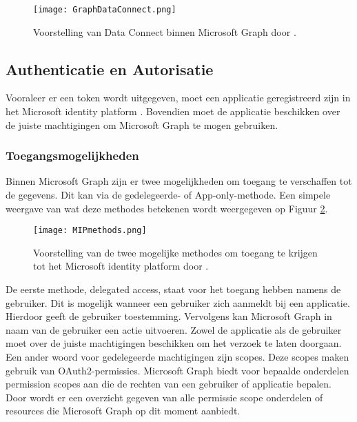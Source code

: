 \begin{figure}[!h]
    \texttt{[image: GraphDataConnect.png]}
    \caption[Voorbeeld Microsoft Graph Data Connect]{Voorstelling van Data Connect binnen Microsoft Graph door \textcite{Microsoft2022c}.}
    \label{MSGDC}
\end{figure}

\subsection{Authenticatie en Autorisatie}

Vooraleer er een token wordt uitgegeven, moet een applicatie geregistreerd zijn in het Microsoft identity platform \autocite{Microsoft2022b}. Bovendien moet de applicatie beschikken over de juiste machtigingen om Microsoft Graph te mogen gebruiken. \\

\subsubsection{Toegangsmogelijkheden}

Binnen Microsoft Graph zijn er twee mogelijkheden om toegang te verschaffen tot de gegevens. Dit kan via de gedelegeerde- of App-only-methode. Een simpele weergave van wat deze methodes betekenen wordt weergegeven op Figuur \ref{MIPM}. \\

\begin{figure}[h]
    \texttt{[image: MIPmethods.png]}
    \caption[Voorbeeld toegangsmogelijkheden]{Voorstelling van de twee mogelijke methodes om toegang te krijgen tot het Microsoft identity platform door \autocite{Microsoft2022b}.}
    \label{MIPM}
\end{figure}

De eerste methode, delegated access, staat voor het toegang hebben namens de gebruiker. Dit is mogelijk wanneer een gebruiker zich aanmeldt bij een applicatie. Hierdoor geeft de gebruiker toestemming. Vervolgens kan Microsoft Graph in naam van de gebruiker een actie uitvoeren. Zowel de applicatie als de gebruiker moet over de juiste machtigingen beschikken om het verzoek te laten doorgaan. \\

Een ander woord voor gedelegeerde machtigingen zijn scopes. Deze scopes maken gebruik van OAuth2-permissies. Microsoft Graph biedt voor bepaalde onderdelen permission scopes aan die de rechten van een gebruiker of applicatie bepalen. Door \textcite{Microsoft2023p} wordt er een overzicht gegeven van alle permissie scope onderdelen of resources die Microsoft Graph op dit moment aanbiedt. \\


